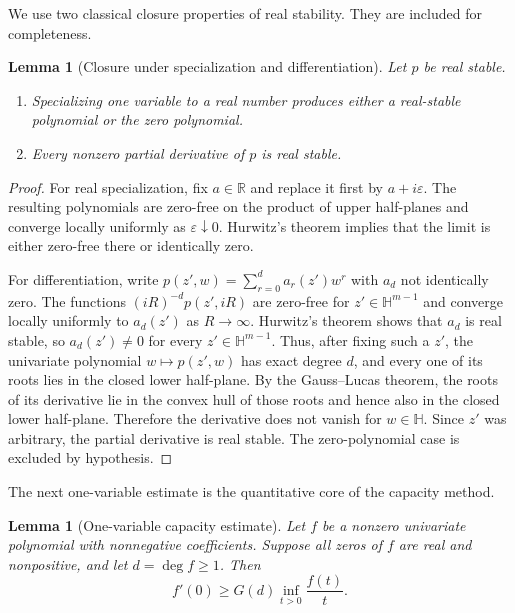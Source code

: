 \documentclass[11pt]{article}
\newtheorem{lemma}[theorem]{Lemma}
\theoremstyle{definition}
\newcommand{\1}{\mathbf{1}}
\newcommand{\cH}{\mathbb{H}}
\newcommand{\eps}{\varepsilon}
\begin{document}
We use two classical closure properties of real stability.  They are included for completeness.

\begin{lemma}[Closure under specialization and differentiation]\label{lem:stability-closure}
Let $p$ be real stable.
\begin{enumerate}[label=\textup{(\roman*)}]
\item Specializing one variable to a real number produces either a real-stable polynomial or the zero polynomial.
\item Every nonzero partial derivative of $p$ is real stable.
\end{enumerate}
\end{lemma}

\begin{proof}
For real specialization, fix $a\in\mathbb R$ and replace it first by $a+i\eps$.  The resulting polynomials are zero-free on the product of upper half-planes and converge locally uniformly as $\eps\downarrow0$.  Hurwitz's theorem implies that the limit is either zero-free there or identically zero.

For differentiation, write $p(z',w)=\sum_{r=0}^d a_r(z')w^r$ with $a_d$ not identically zero.  The functions $(iR)^{-d}p(z',iR)$ are zero-free for $z'\in\cH^{m-1}$ and converge locally uniformly to $a_d(z')$ as $R\to\infty$.  Hurwitz's theorem shows that $a_d$ is real stable, so $a_d(z')\ne0$ for every $z'\in\cH^{m-1}$.  Thus, after fixing such a $z'$, the univariate polynomial $w\mapsto p(z',w)$ has exact degree $d$, and every one of its roots lies in the closed lower half-plane.  By the Gauss--Lucas theorem, the roots of its derivative lie in the convex hull of those roots and hence also in the closed lower half-plane.  Therefore the derivative does not vanish for $w\in\cH$.  Since $z'$ was arbitrary, the partial derivative is real stable.  The zero-polynomial case is excluded by hypothesis.
\end{proof}

The next one-variable estimate is the quantitative core of the capacity method.

\begin{lemma}[One-variable capacity estimate]\label{lem:one-variable}
Let $f$ be a nonzero univariate polynomial with nonnegative coefficients.  Suppose all zeros of $f$ are real and nonpositive, and let $d=\deg f\ge1$.  Then
\[
 f'(0)\ge G(d)\inf_{t>0}\frac{f(t)}t.
 \tag{3.2}\label{eq:one-variable}
\]
\end{lemma}
\end{document}
